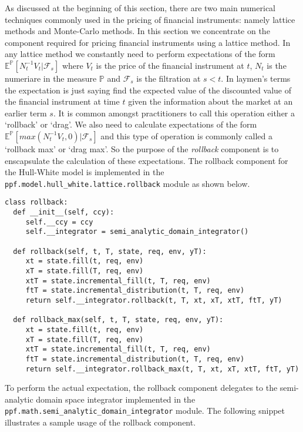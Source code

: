As discussed at the beginning of this section, there are two main
numerical techniques commonly used in the pricing of financial
instruments: namely lattice methods and Monte-Carlo methods. In this
section we concentrate on the component required for pricing financial
instruments using a lattice method. In any lattice method we
constantly need to perform expectations of the form $\mathbb
E^{\mathbb P}[N_t^{-1}V_t | \mathcal F_s]$ where $V_t$ is the price of
the financial instrument at $t$, $N_t$ is the numeriare in the measure
$\mathbb P$ and $\mathcal F_s$ is the filtration at $s<t$. In laymen's
terms the expectation is just saying find the expected value of the
discounted value of the financial instrument at time $t$ given the
information about the market at an earlier term $s$. It is common
amongst practitioners to call this operation either a `rollback' or
`drag'. We also need to calculate expectations of the form $\mathbb
E^{\mathbb P}[max\left(N_t^{-1}V_t,0\right) | \mathcal F_s]$ and this
type of operation is commonly called a `rollback max' or `drag
max'. So the purpose of the \emph{rollback} component is to
enscapsulate the calculation of these expectations. The rollback
component for the Hull-White model is implemented in the
\verb|ppf.model.hull_white.lattice.rollback| module as shown below.
\begin{verbatim}
class rollback:
  def __init__(self, ccy):
     self.__ccy = ccy
     self.__integrator = semi_analytic_domain_integrator() 

  def rollback(self, t, T, state, req, env, yT):
     xt = state.fill(t, req, env)
     xT = state.fill(T, req, env)
     xtT = state.incremental_fill(t, T, req, env)
     ftT = state.incremental_distribution(t, T, req, env)
     return self.__integrator.rollback(t, T, xt, xT, xtT, ftT, yT)

  def rollback_max(self, t, T, state, req, env, yT):
     xt = state.fill(t, req, env)
     xT = state.fill(T, req, env)
     xtT = state.incremental_fill(t, T, req, env)
     ftT = state.incremental_distribution(t, T, req, env)
     return self.__integrator.rollback_max(t, T, xt, xT, xtT, ftT, yT)

\end{verbatim}
To perform the actual expectation, the rollback component delegates to
the semi-analytic domain space integrator implemented in the \\
\verb|ppf.math.semi_analytic_domain_integrator| module. The following
snippet illustrates a sample usage of the rollback component.
